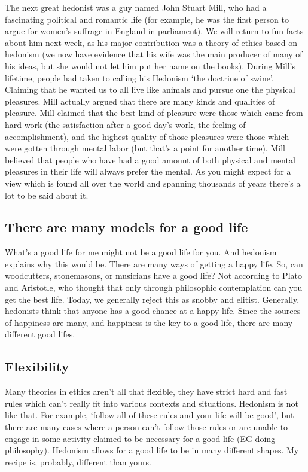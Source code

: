 The next great hedonist was a guy named John Stuart Mill, who had a fascinating political and romantic life (for example, he was the first person to argue for women’s suffrage in England in parliament). We will return to fun facts about him next week, as his major contribution was a theory of ethics based on hedonism (we now have evidence that his wife was the main producer of many of his ideas, but she would not let him put her name on the books). During Mill’s lifetime, people had taken to calling his Hedonism ‘the doctrine of swine’. Claiming that he wanted us to all live like animals and pursue one the physical pleasures.  Mill actually argued that there are many kinds and qualities of pleasure. Mill claimed that the best kind of pleasure were those which came from hard work (the satisfaction after a good day’s work, the feeling of accomplishment), and the highest quality of those pleasures were those which were gotten through mental labor (but that’s a point for another time). Mill believed that people who have had a good amount of both physical and mental pleasures in their life will always prefer the mental. As you might expect for a view which is found all over the world and spanning thousands of years there’s a lot to be said about it. 

\subsection{There are many models for a good life}

What’s a good life for me might not be a good life for you. And hedonism explains why this would be. There are many ways of getting a happy life. So, can woodcutters, stonemasons, or musicians have a good life? Not according to Plato and Aristotle, who thought that only through philosophic contemplation can you get the best life. Today, we generally reject this as snobby and elitist. Generally, hedonists think that anyone has a good chance at a happy life. Since the sources of happiness are many, and happiness is the key to a good life, there are many different good lifes.
\subsection{Flexibility}

Many theories in ethics aren’t all that flexible, they have strict hard and fast rules which can’t really fit into various contexts and situations. Hedonism is not like that. For example, ‘follow all of these rules and your life will be good’, but there are many cases where a person can’t follow those rules or are unable to engage in some activity claimed to be necessary for a good life (EG doing philosophy). Hedonism allows for a good life to be in many different shapes. My recipe is, probably, different than yours.
